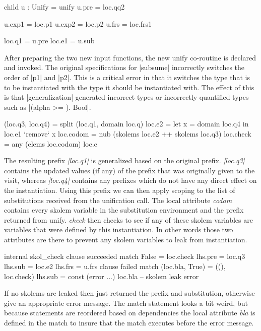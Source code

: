 \begin{code}
child u : Unify = unify
u.pre  = loc.qq2

u.exp1  = loc.p1
u.exp2  = loc.p2
u.frs   = loc.frs1
        
loc.q1  = u.pre
loc.e1  = u.sub
\end{code}
After preparing the two new input functions, the new unify co-routine is declared and invoked. The original specifications for |subsume| incorrectly switches the order of |p1| and |p2|. This is a critical error in that it switches the type that is to be instantiated with the type it should be instantiated with. The effect of this is that |generalization| generated incorrect types or incorrectly quantified types such as |(alpha >= \bot). Bool|.

\begin{code}   
(loc.q3, loc.q4) = split (loc.q1, domain loc.q)
loc.e2 =  let x = domain loc.q4
          in loc.e1 `remove` x
loc.codom  = nub (skolems loc.e2 ++ skolems loc.q3)
loc.check  = any (elems loc.codom) loc.c
\end{code}
The resulting prefix \emph{|loc.q1|} is generalized based on the original prefix. \emph{|loc.q3|} contains the updated values (if any) of the prefix that was  originally given to the visit, whereas \emph{|loc.q4|} contains any prefixes which do not have any direct effect on the instantiation. Using this prefix we can then apply scoping to the list of substitutions received from the unification call.
The local attribute \emph{codom} contains every skolem variable in the substitution environment and the prefix returned from unify. \emph{check} then checks to see if any of these skolem variables are variables that were defined by this instantiation. In other words those two attributes are there to prevent any skolem variables to leak from instantiation.

\begin{code}
internal skol_check
  clause succeeded
    match False  = loc.check
    lhs.pre  = loc.q3
    lhs.sub  = loc.e2
    lhs.frs  = u.frs
  clause failed
    match (loc.bla, True) = ((), loc.check)
    lhs.sub = const (error ...) loc.bla -- skolem leak error
\end{code}
If no skolems are leaked then just returned the prefix and substitution, otherwise give an appropriate error message. The match statement looks a bit weird, but because statements are reordered based on dependencies the local attribute \emph{bla} is defined in the match to insure that the match executes before the error message.

